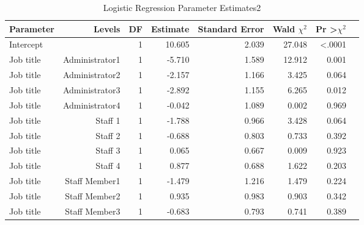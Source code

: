 \begin{table}[]
	\centering
	\scriptsize %
	\caption{Logistic Regression Parameter Estimates2}
	\label{ta:4.2}
	\begin{tabular}{lrrrrrrr}
		\toprule
		Parameter & Levels                    & DF & Estimate & Standard Error & Wald $\chi^2$ & Pr \textgreater $\chi^2$ \\ \midrule
		Intercept &                           & 1  & 10.605   & 2.039          & 27.048                   & \textless.0001                      \\
		Job title & Administrator1            & 1  & -5.710   & 1.589          & 12.912                   & 0.001                               \\
		Job title & Administrator2            & 1  & -2.157   & 1.166          & 3.425                    & 0.064                               \\
		Job title & Administrator3            & 1  & -2.892   & 1.155          & 6.265                    & 0.012                               \\
		Job title & Administrator4            & 1  & -0.042   & 1.089          & 0.002                    & 0.969                               \\
		Job title & Staff 1                   & 1  & -1.788   & 0.966          & 3.428                    & 0.064                               \\
		Job title & Staff 2                   & 1  & -0.688   & 0.803          & 0.733                    & 0.392                               \\
		Job title & Staff 3                   & 1  & 0.065    & 0.667          & 0.009                    & 0.923                               \\
		Job title & Staff 4                   & 1  & 0.877    & 0.688          & 1.622                    & 0.203                               \\
		Job title & Staff Member1             & 1  & -1.479   & 1.216          & 1.479                    & 0.224                               \\
		Job title & Staff Member2             & 1  & 0.935    & 0.983          & 0.903                    & 0.342                               \\
		Job title & Staff Member3             & 1  & -0.683   & 0.793          & 0.741                    & 0.389                               \\

\end{tabular}
\end{table}
